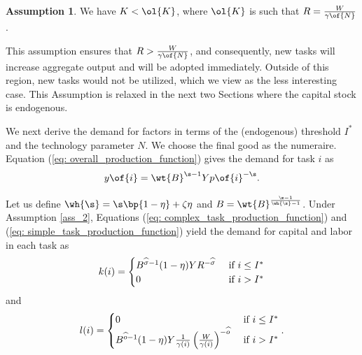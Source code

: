 \documentclass[12pt]{article}
\theoremstyle{definition}
\newtheorem{assumption}{Assumption}
\begin{document}
\begin{assumption}
    \label{ass_3}
	We have $K  < \ol{K}$, where $\ol{K}$ is such that $R = \frac{W}{\gamma\of{N}}$.
\end{assumption}
This assumption ensures that $R > \frac{W}{\gamma\of{N}}$, and consequently, new tasks will increase aggregate output and will be adopted immediately. Outside of this region, new tasks would not be utilized, which we view as the less interesting case. This Assumption is relaxed in the next two Sections where the capital stock is endogenous.

We next derive the demand for factors in terms of the (endogenous) threshold $I^*$ and the technology parameter $N$. We choose the final good as the numeraire. Equation (\ref{eq: overall_production_function}) gives the demand for task $i$ as 
\begin{equation}
    \label{eq: demand_for_task_i}
    y\of{i} = \wt{B}^{\s - 1} Y p\of{i}^{-\s}.
\end{equation}

Let us define $\wh{\s} = \s\bp{1 - \eta} + \zeta \eta$ and $B = \wt{B}^{\frac{\s-1}{\wh{\s}-1}}$. Under Assumption \ref{ass_2}, Equations (\ref{eq: complex_task_production_function}) and (\ref{eq: simple_task_production_function}) yield the demand for capital and labor in each task as 
\begin{equation}
    \notag 
    k(i)= \begin{cases}B^{\widehat{\sigma}-1}(1-\eta) Y R^{-\widehat{\sigma}} & \text { if } i \leq I^* \\ 0 & \text { if } i>I^*\end{cases}
\end{equation}
and 
\begin{equation}
    \notag 
    l(i)= \begin{cases}0 & \text { if } i \leq I^* \\ B^{\widehat{o}-1}(1-\eta) Y \frac{1}{\gamma(i)}\left(\frac{W}{\gamma(i)}\right)^{-\widehat{o}} & \text { if } i>I^*\end{cases} .
\end{equation}
\end{document}
